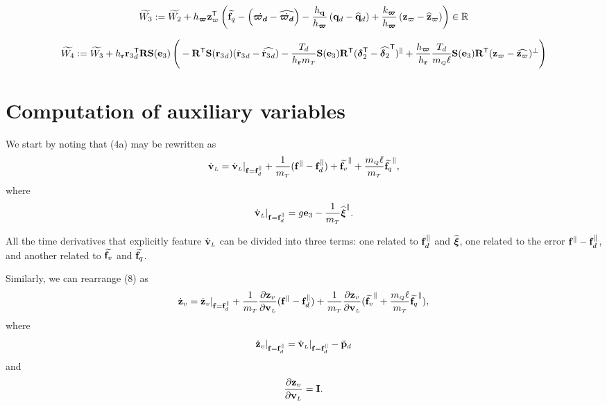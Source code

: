 \documentclass[journal,onecolumn]{IEEEtran}
\begin{document}
\begin{align}
	\widetilde{W_3} := \widetilde{W_2} + h_{\bs\varpi}\zc[T]\LP\widetilde{\f_q} - \LP\dot{\bs{\varpi_d}} - \widehat{\dot{\bs{\varpi_d}}}\RP -  \frac{h_\v{q}}{h_{\bs{\varpi}}}\LP\dird-\qdhat
	\RP + \frac{k_{\bs{\varpi}}}{h_{\bs{\varpi}}}\LP\zc-\zchat\RP\RP\in\mathbb{R}
\end{align}

\begin{align}
	\widetilde{W_4}:=\widetilde{W_3} + h_\v{r}\rzd\trs \RotM\Skew{\ez}\LP
	\vphantom{\LP\frac{\partial V_4}{\partial\vL}\dir\RP\trs}
	-\RotM[T]\Skew{\rzd}(\rzddot-\widehat{\rzddot})
	-\frac{T_d}{h_\v{r}\mT}\Skew{\ez}\RotM[T](\bs{\delta}_2\trs-\widehat{\bs{\delta}_2}\trs)^{\|}
	+\frac{h_{\bs\varpi}}{h_\v{r}}\frac{T_d}{\mQ\ellp}\Skew{\ez}\RotM[T](\zc-\widehat{\zc})^{\perp}\RP
\end{align}


\section{Computation of auxiliary variables}
\label{sec:aux_notation}

	We start by noting that (4a) may be rewritten as
	\begin{equation}
		\vLdot = \vLdot|_{\f=\fd^{\|}} + \frac{1}{\mT}(\f^{\|}-\fd^{\|}) + \widetilde{\f_v}^{\|} + \frac{\mQ\ellp}{\mT}\widetilde{\f_q}^{\|},
		\label{eq:vL_dot_aux1}
	\end{equation}
	where
	\begin{equation}
		\vLdot|_{\f=\fd^{\|}} = g\ez - \frac{1}{\mT}\widehat{\Xiq}^{\|}.
	\end{equation}

	All the time derivatives that explicitly feature $\vLdot$ can be divided into three terms: one related to $\fd^{\|}$ and $\widehat{\Xiq}$, one related to the error $\f^{\|}-\fd^{\|}$, and another related to $\widetilde{\f_v}$ and $\widetilde{\f_q}$.

	Similarly, we can rearrange (8) as
	\begin{equation}
		\zvdot = \zvdot|_{\f=\fd^{\|}} + \frac{1}{\mT}\frac{\partial\zv}{\partial\vL}(\f^{\|}-\fd^{\|}) + \frac{1}{\mT}\frac{\partial\zv}{\partial\vL}(\widetilde{\f_v}^{\|} + \frac{\mQ\ellp}{\mT}\widetilde{\f_q}^{\|}),
		\label{eq:zv_dot_aux1}
	\end{equation}
	where
	\begin{equation}
		\zvdot|_{\f=\fd^{\|}} = \vLdot|_{\f=\fd^{\|}} - \pLdddot
	\end{equation}
	and
	\begin{equation}
		\frac{\partial\zv}{\partial\vL} = \v{I}.
	\end{equation}
\end{document}
